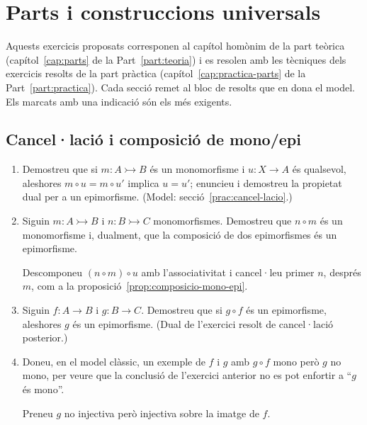 \chapter{Parts i construccions universals}\label{cap:exercicis-parts}

Aquests exercicis proposats corresponen al capítol homònim de la part teòrica (capítol~\ref{cap:parts} de la Part~\ref{part:teoria}) i es resolen amb les tècniques dels exercicis resolts de la part pràctica (capítol~\ref{cap:practica-parts} de la Part~\ref{part:practica}). Cada secció remet al bloc de resolts que en dona el model. Els marcats amb una indicació són els més exigents.

\section{Cancel·lació i composició de mono/epi}

\begin{enumerate}
  \item Demostreu que si \(m:A\rightarrowtail B\) és un monomorfisme i \(u:X\to A\) és qualsevol, aleshores \(m\circ u=m\circ u'\) implica \(u=u'\); enuncieu i demostreu la propietat dual per a un epimorfisme. (Model: secció~\ref{prac:cancel-lacio}.)

  \item Siguin \(m:A\rightarrowtail B\) i \(n:B\rightarrowtail C\) monomorfismes. Demostreu que \(n\circ m\) és un monomorfisme i, dualment, que la composició de dos epimorfismes és un epimorfisme. \begin{indicacio}Descomponeu \((n\circ m)\circ u\) amb l'associativitat i cancel·leu primer \(n\), després \(m\), com a la proposició~\ref{prop:composicio-mono-epi}.\end{indicacio}

  \item Siguin \(f:A\to B\) i \(g:B\to C\). Demostreu que si \(g\circ f\) és un epimorfisme, aleshores \(g\) és un epimorfisme. (Dual de l'exercici resolt de cancel·lació posterior.)

  \item Doneu, en el model clàssic, un exemple de \(f\) i \(g\) amb \(g\circ f\) mono però \(g\) no mono, per veure que la conclusió de l'exercici anterior no es pot enfortir a \enquote{\(g\) és mono}. \begin{indicacio}Preneu \(g\) no injectiva però injectiva sobre la imatge de \(f\).\end{indicacio}
\end{enumerate}


